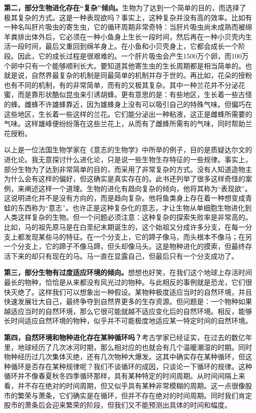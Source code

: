 \textbf{第二，部分生物进化存在“复杂”倾向。}生物为了达到一个简单的目的，而选择了极其复杂的方式。这是一种表现欲吗？事实上，这种复杂并没有高的效率。比如有一种名叫肝片吸虫的寄生虫，它的循环周期非常奇特：当肝片吸虫尚未成熟而被绵羊粪排出体外后，它必须在一种小鱼身上生长一段时间，然后再在一种小贝壳内生活一段时间，最后又重回到绵羊身上。在小鱼和小贝壳身上，它都会成长一个阶段。因此，它的成长过程是很艰难的。一个肝片吸虫会产生1500万个卵，而100万个卵中只有一个能够顺利长大。要知道其他寄生虫的生长周期都是相当简单的。也就是说，自然界最复杂的机制是同最简单的机制并存于世的。再比如，花朵的授粉也有不同的机制，有的非常简单，而有的又极其复杂。其中一种兰花并不分泌花蜜，而是靠形状酷似昆虫来引诱胡蜂。更有意思的是：有些地区，生长着一些古怪的蜂。雌蜂不许雄蜂靠近，因为雄蜂身上没有可以吸引自己的特殊气味。但偏巧在这些地区，生长着一些这样的兰花。它们能分泌出一种粘液，这正是雌蜂所需要的气味。这样雄峰便纷纷落在这些兰花上，从而有了雌蜂所需有的气味，同时帮助兰花授粉。

以上是一位法国生物学家在《意志的生物学》中所举的例子，目的是质疑达尔文的进化论。我无意探讨什么进化论，只是说一些生物生存特征的一些规律。事实上，部分生物为了达到非常简单的目的，而采用了非常复杂的方式。没有人知道造物主为什么会有这样的偏好，但这确实是真实存在的。此书还列举了很多这样奇怪的案例，来阐述这样一个道理。生物的进化有趋向复杂的倾向，他将其称为“表现欲”。这说明进化并不是没有方向的，而是趋向复杂。他将鱼类身上存在着一种想变成青蛙的东西称为“意志”。也许正是这种复杂化的意志，才让生物从单细胞生物进化到人类这样复杂的生物。但一个问题必须注意：这种复杂的探索失败率是非常高的。比如，马的祖先原马是在白垩纪末期诞生的，这个始祖又分成许多分支，在每一分支上都发现某些马的特征。在一个分支上，它的蹄子像马，而头根本不像马；在另一个分支上，它的蹄子不像马蹄，但头却像马头。这是物种进化的摸索，但最终存活下来的却只有现在的马。马一直在显露自己，但最后只有一个分支成功了。

\textbf{第三，部分生物有过度适应环境的倾向。}想想也好笑，在我们这个地球上存活时间最长的物种，恰恰是从来都没有风光过的物种。与此相反的事例就是恐龙，它们很快灭绝了。这样我们可以想象出一种假设。某物种极度适应当时的自然环境，并且快速发展壮大自己，最终争夺到自然界更多的生存资源。但问题是：一个物种如果越适应当时的自然环境，那么它很可能就越不适应变化后的自然环境。相反，能够长时间适应自然环境的物种，似乎并不可能极度地适应某一特定时间的自然环境。

\textbf{第四，自然环境和物种进化存在某种循环吗？}考古学家已经证实，在过去的数亿年里，地球经历了几次冰河时期，那么相对应的也就会有几个温暖潮湿的时期。同时物种经历过几次集体灭绝，还有几次物种大爆发。这其中确实存在某种循环，但这种循环是否存在某种规律呢？我们不谈循环的成因，只谈论一下循环的规律。这种循环并不像春夏秋冬四季循环那样，具有某种特定的时间周期。从时间间隔上来看，并不存在绝对的时间周期，但又似乎具有某种非常模糊的周期。这一点很像股市的繁荣与萧条，它们确实是在循环，但并不存在绝对的时间周期。同时我们肯定股市的萧条后会迎来繁荣的阶段，但我们又不能预测出具体的时间和幅度。

